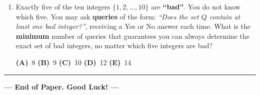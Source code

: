 \documentclass[a4paper,12pt]{article}
\newcommand{\hchoices}[5]{%
  \par\vspace{5pt}%
  \noindent\hspace{2em}%
  \textbf{(A)}~#1\hfill%
  \textbf{(B)}~#2\hfill%
  \textbf{(C)}~#3\hfill%
  \textbf{(D)}~#4\hfill%
  \textbf{(E)}~#5\par%
  \vspace{4pt}%
}
\begin{document}
\begin{enumerate}[label=\textbf{Q\arabic*.},
                  itemsep=3.5ex,
                  leftmargin=3.8em,
                  parsep=0pt,
                  start=13]
\begin{center}
\begin{minipage}[b]{0.38\linewidth}\centering
  \par{}
\end{minipage}
\hspace{3em}
\begin{minipage}[b]{0.38\linewidth}\centering
  \par{}
\end{minipage}
\end{center}
\bigskip

What is $P_A + P_B + P_C + P_D + P_E$?

\hchoices{28}{31}{34}{37}{40}

\item Exactly five of the ten integers $\{1, 2, \ldots, 10\}$ are
\textbf{``bad''}. You do not know which five. You may ask
\textbf{queries} of the form: \textit{``Does the set $Q$ contain at least
one bad integer?''}, receiving a Yes or No answer each time. What is the
\textbf{minimum} number of queries that guarantees you can always determine
the exact set of bad integers, no matter which five integers are bad?

\hchoices{8}{9}{10}{12}{14}

\end{enumerate}

\vspace{2ex}
\hrule
\vspace{1.5ex}
\begin{center}
  \Large\bfseries --- End of Paper. Good Luck! ---
\end{center}
\end{document}
